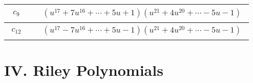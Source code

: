 \documentclass[1p]{elsarticle_modified}
\theoremstyle{definition}
\begin{document}
\begin{tabular}{m{50pt}|m{274pt}}
\hline $$\begin{aligned}c_{9}\end{aligned}$$&$\begin{aligned}
&(u^{17}+7 u^{16}+\cdots+5 u+1)(u^{21}+4 u^{20}+\cdots-5 u-1)
\end{aligned}$\\
\hline $$\begin{aligned}c_{12}\end{aligned}$$&$\begin{aligned}
&(u^{17}-7 u^{16}+\cdots+5 u-1)(u^{21}+4 u^{20}+\cdots-5 u-1)
\end{aligned}$\\
\hline
\end{tabular}\newpage\renewcommand{\arraystretch}{1}
\centering \section*{ IV. Riley Polynomials}
\end{document}
